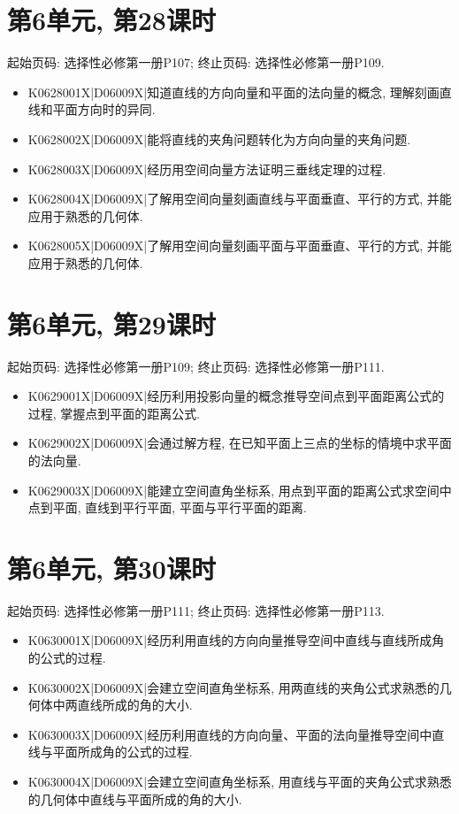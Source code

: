 \section*{第6单元, 第28课时}
起始页码: 选择性必修第一册P107; 终止页码: 选择性必修第一册P109.
\begin{itemize}
\item K0628001X|D06009X|知道直线的方向向量和平面的法向量的概念, 理解刻画直线和平面方向时的异同.
\item K0628002X|D06009X|能将直线的夹角问题转化为方向向量的夹角问题.
\item K0628003X|D06009X|经历用空间向量方法证明三垂线定理的过程.
\item K0628004X|D06009X|了解用空间向量刻画直线与平面垂直、平行的方式, 并能应用于熟悉的几何体.
\item K0628005X|D06009X|了解用空间向量刻画平面与平面垂直、平行的方式, 并能应用于熟悉的几何体.
\end{itemize}

\section*{第6单元, 第29课时}
起始页码: 选择性必修第一册P109; 终止页码: 选择性必修第一册P111.
\begin{itemize}
\item K0629001X|D06009X|经历利用投影向量的概念推导空间点到平面距离公式的过程, 掌握点到平面的距离公式.
\item K0629002X|D06009X|会通过解方程, 在已知平面上三点的坐标的情境中求平面的法向量.
\item K0629003X|D06009X|能建立空间直角坐标系, 用点到平面的距离公式求空间中点到平面, 直线到平行平面, 平面与平行平面的距离.
\end{itemize}

\section*{第6单元, 第30课时}
起始页码: 选择性必修第一册P111; 终止页码: 选择性必修第一册P113.
\begin{itemize}
\item K0630001X|D06009X|经历利用直线的方向向量推导空间中直线与直线所成角的公式的过程.
\item K0630002X|D06009X|会建立空间直角坐标系, 用两直线的夹角公式求熟悉的几何体中两直线所成的角的大小.
\item K0630003X|D06009X|经历利用直线的方向向量、平面的法向量推导空间中直线与平面所成角的公式的过程.
\item K0630004X|D06009X|会建立空间直角坐标系, 用直线与平面的夹角公式求熟悉的几何体中直线与平面所成的角的大小.
\end{itemize}

